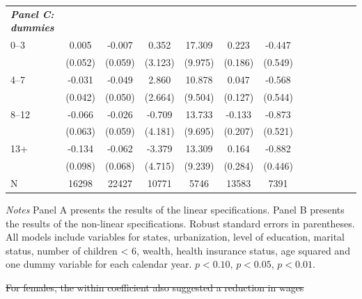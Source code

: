 \documentclass[12pt,english]{article}
\providecommand{\DIFdeltex}[1]{{\protect\color{red}\sout{#1}}}                      %
\providecommand{\DIFaddbegin}{} %
\providecommand{\DIFdelbegin}{} %
\providecommand{\DIFdelend}{} %
\providecommand{\DIFdelendFL}{} %
\providecommand{\DIFdel}[1]{\texorpdfstring{\DIFdeltex{#1}}{}} %
\begin{document}
\begin{table}[!ht]
\begin{center}
\begin{adjustbox}{max width=.9\linewidth}
\begin{threeparttable}
{\begin{tabular}{l*{6}{S S}}
\DIFdelendFL \textit{\textbf{Panel C: dummies}} &&&&&&\\
						 0--3&    0.005         &   -0.007         &    0.352         &   17.309\sym{*}  &    0.223         &   -0.447         \\
						&  (0.052)         &  (0.059)         &  (3.123)         &  (9.975)         &  (0.186)         &  (0.549)         \\
						4--7&    -0.031         &   -0.049         &    2.860         &   10.878         &    0.047         &   -0.568         \\
						&  (0.042)         &  (0.050)         &  (2.664)         &  (9.504)         &  (0.127)         &  (0.544)         \\
						8--12&    -0.066         &   -0.026         &   -0.709         &   13.733         &   -0.133         &   -0.873\sym{*}  \\
						&  (0.063)         &  (0.059)         &  (4.181)         &  (9.695)         &  (0.207)         &  (0.521)         \\
						13+&   -0.134         &   -0.062         &   -3.379         &   13.309         &    0.164         &   -0.882\sym{**} \\
						&  (0.098)         &  (0.068)         &  (4.715)         &  (9.239)         &  (0.284)         &  (0.446)         \\
				\midrule
						N         &    16298         &    22427         &    10771         &     5746         &    13583         &     7391         \\
						\bottomrule
					\end{tabular}
					\begin{tablenotes}
						\item \footnotesize \textit{Notes} Panel A presents the results of the linear specifications. Panel B presents the results of the non-linear specifications. Robust standard errors in parentheses. All models include variables for  states, urbanization, level of education, marital status, number of children < 6, wealth, health insurance status, age squared and one dummy variable for each calendar year. \sym{*} \(p<0.10\), \sym{**} \(p<0.05\), \sym{***} \(p<0.01\).
					\end{tablenotes}
				}
			\end{threeparttable}
		\end{adjustbox}
	\end{center}
\end{table}
\DIFdelbegin \DIFdel{For females, the within coefficient also suggested a reduction in wages }\DIFdelend \DIFaddbegin 
\end{document}
